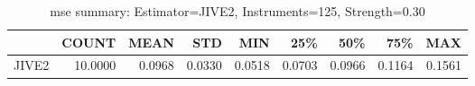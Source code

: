 \begin{table}[ht]
\centering
\caption{mse summary: Estimator=JIVE2, Instruments=125, Strength=0.30}
\begin{tabular}{lrrrrrrrr}
\toprule
 & COUNT & MEAN & STD & MIN & 25\% & 50\% & 75\% & MAX \\
\midrule
JIVE2 & 10.0000 & 0.0968 & 0.0330 & 0.0518 & 0.0703 & 0.0966 & 0.1164 & 0.1561 \\
\bottomrule
\end{tabular}
\end{table}
